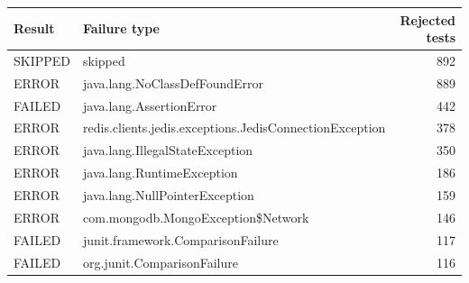   \renewcommand{\theHreporttablerow}{rq6_non_passing_failure_types.\arabic{reporttablerow}}
  \setcounter{reporttablerow}{0}
  \begin{tabular}{llr}
  \toprule
  Result & Failure type & Rejected tests \\
  \midrule
  {reporttablerow}\label{tabrow:rq6_non_passing_failure_types:skipped}SKIPPED & skipped & 892 \\
  {reporttablerow}\label{tabrow:rq6_non_passing_failure_types:java.lang.NoClassDefFoundError}ERROR & java.lang.NoClassDefFoundError & 889 \\
  {reporttablerow}\label{tabrow:rq6_non_passing_failure_types:java.lang.AssertionError}FAILED & java.lang.AssertionError & 442 \\
  {reporttablerow}\label{tabrow:rq6_non_passing_failure_types:redis.clients.jedis.exceptions.JedisConnectionException}ERROR & redis.clients.jedis.exceptions.JedisConnectionException & 378 \\
  {reporttablerow}\label{tabrow:rq6_non_passing_failure_types:java.lang.IllegalStateException}ERROR & java.lang.IllegalStateException & 350 \\
  {reporttablerow}\label{tabrow:rq6_non_passing_failure_types:java.lang.RuntimeException}ERROR & java.lang.RuntimeException & 186 \\
  {reporttablerow}\label{tabrow:rq6_non_passing_failure_types:java.lang.NullPointerException}ERROR & java.lang.NullPointerException & 159 \\
  {reporttablerow}\label{tabrow:rq6_non_passing_failure_types:com.mongodb.MongoException@24Network}ERROR & com.mongodb.MongoException\$Network & 146 \\
  {reporttablerow}\label{tabrow:rq6_non_passing_failure_types:junit.framework.ComparisonFailure}FAILED & junit.framework.ComparisonFailure & 117 \\
  {reporttablerow}\label{tabrow:rq6_non_passing_failure_types:org.junit.ComparisonFailure}FAILED & org.junit.ComparisonFailure & 116 \\
  \bottomrule
  \end{tabular}
